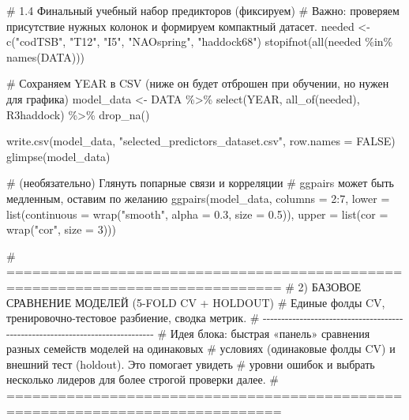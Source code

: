 \documentclass[
  letterpaper,
  DIV=11,
  numbers=noendperiod]{scrreprt}
\newenvironment{Shaded}{\begin{snugshade}}{\end{snugshade}}
\newcommand{\AttributeTok}[1]{\textcolor[rgb]{0.40,0.45,0.13}{#1}}
\newcommand{\CommentTok}[1]{\textcolor[rgb]{0.37,0.37,0.37}{#1}}
\newcommand{\ConstantTok}[1]{\textcolor[rgb]{0.56,0.35,0.01}{#1}}
\newcommand{\DecValTok}[1]{\textcolor[rgb]{0.68,0.00,0.00}{#1}}
\newcommand{\FloatTok}[1]{\textcolor[rgb]{0.68,0.00,0.00}{#1}}
\newcommand{\FunctionTok}[1]{\textcolor[rgb]{0.28,0.35,0.67}{#1}}
\newcommand{\NormalTok}[1]{\textcolor[rgb]{0.00,0.23,0.31}{#1}}
\newcommand{\OtherTok}[1]{\textcolor[rgb]{0.00,0.23,0.31}{#1}}
\newcommand{\SpecialCharTok}[1]{\textcolor[rgb]{0.37,0.37,0.37}{#1}}
\newcommand{\StringTok}[1]{\textcolor[rgb]{0.13,0.47,0.30}{#1}}
\begin{document}
\begin{Shaded}
\begin{Highlighting}[]
\CommentTok{\# 1.4 Финальный учебный набор предикторов (фиксируем)}
\CommentTok{\# Важно: проверяем присутствие нужных колонок и формируем компактный датасет.}
\NormalTok{needed }\OtherTok{\textless{}{-}} \FunctionTok{c}\NormalTok{(}\StringTok{"codTSB"}\NormalTok{, }\StringTok{"T12"}\NormalTok{, }\StringTok{"I5"}\NormalTok{, }\StringTok{"NAOspring"}\NormalTok{, }\StringTok{"haddock68"}\NormalTok{)}
\FunctionTok{stopifnot}\NormalTok{(}\FunctionTok{all}\NormalTok{(needed }\SpecialCharTok{\%in\%} \FunctionTok{names}\NormalTok{(DATA)))}

\CommentTok{\# Сохраняем YEAR в CSV (ниже он будет отброшен при обучении, но нужен для графика)}
\NormalTok{model\_data }\OtherTok{\textless{}{-}}\NormalTok{ DATA }\SpecialCharTok{\%\textgreater{}\%}
  \FunctionTok{select}\NormalTok{(YEAR, }\FunctionTok{all\_of}\NormalTok{(needed), R3haddock) }\SpecialCharTok{\%\textgreater{}\%}
  \FunctionTok{drop\_na}\NormalTok{()}

\FunctionTok{write.csv}\NormalTok{(model\_data, }\StringTok{"selected\_predictors\_dataset.csv"}\NormalTok{, }\AttributeTok{row.names =} \ConstantTok{FALSE}\NormalTok{)}
\FunctionTok{glimpse}\NormalTok{(model\_data)}

\CommentTok{\# (необязательно) Глянуть попарные связи и корреляции}
\CommentTok{\# ggpairs может быть медленным, оставим по желанию}
 \FunctionTok{ggpairs}\NormalTok{(model\_data, }\AttributeTok{columns =} \DecValTok{2}\SpecialCharTok{:}\DecValTok{7}\NormalTok{,}
         \AttributeTok{lower =} \FunctionTok{list}\NormalTok{(}\AttributeTok{continuous =} \FunctionTok{wrap}\NormalTok{(}\StringTok{"smooth"}\NormalTok{, }\AttributeTok{alpha =} \FloatTok{0.3}\NormalTok{, }\AttributeTok{size =} \FloatTok{0.5}\NormalTok{)),}
         \AttributeTok{upper =} \FunctionTok{list}\NormalTok{(}\AttributeTok{cor =} \FunctionTok{wrap}\NormalTok{(}\StringTok{"cor"}\NormalTok{, }\AttributeTok{size =} \DecValTok{3}\NormalTok{)))}


\CommentTok{\# ==============================================================================}
\CommentTok{\# 2) БАЗОВОЕ СРАВНЕНИЕ МОДЕЛЕЙ (5{-}FOLD CV + HOLDOUT)}
\CommentTok{\# Единые фолды CV, тренировочно{-}тестовое разбиение, сводка метрик.}
\CommentTok{\# {-}{-}{-}{-}{-}{-}{-}{-}{-}{-}{-}{-}{-}{-}{-}{-}{-}{-}{-}{-}{-}{-}{-}{-}{-}{-}{-}{-}{-}{-}{-}{-}{-}{-}{-}{-}{-}{-}{-}{-}{-}{-}{-}{-}{-}{-}{-}{-}{-}{-}{-}{-}{-}{-}{-}{-}{-}{-}{-}{-}{-}{-}{-}{-}{-}{-}{-}{-}{-}{-}{-}{-}{-}{-}{-}{-}{-}{-}}
\CommentTok{\# Идея блока: быстрая «панель» сравнения разных семейств моделей на одинаковых}
\CommentTok{\# условиях (одинаковые фолды CV) и внешний тест (holdout). Это помогает увидеть}
\CommentTok{\# уровни ошибок и выбрать несколько лидеров для более строгой проверки далее.}
\CommentTok{\# ==============================================================================}


\end{Highlighting}
\end{Shaded}
\end{document}
